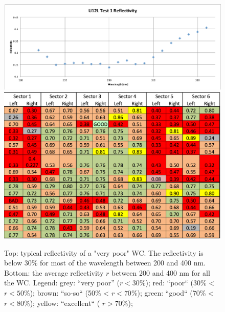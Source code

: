 \begin{figure}
	\centering
	\includegraphics[width=0.95\columnwidth,keepaspectratio]{img/winstoConeSample2Reflectivity.png}
	\includegraphics[width=0.95\columnwidth,keepaspectratio]{img/wcStatusBefore.png}
	\caption{Top: typical reflectivity of a "very poor" WC. The reflectivity is below 30\% for most of the wavelength between 200 and 400 nm. Bottom: the average reflectivity $r$ between 200 and 400 nm for
            all the WC. Legend: grey: ``very poor'' ($r < 30\%$); red: ``poor`` (30\% < $r < 50\%$); brown: ``so-so`` (50\% < $r < 70\%$); green: ``good`` (70\% < $r < 80\%$); yellow: ``excellent`` ( $r > 70\%$); }
	\label{fig:wcStatusBefore}
\end{figure}


